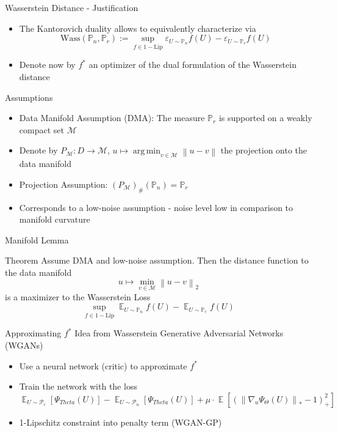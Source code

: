 \documentclass{beamer}
\newcommand{\norm}[1]{\left\lVert#1\right\rVert}
\DeclareMathOperator*{\argmin}{arg\,min}
\DeclareMathOperator{\EX}{\mathbb{E}}%
\begin{document}
\begin{frame}{Wasserstein Distance - Justification}
\begin{itemize}
\item The Kantorovich duality allows to equivalently characterize via 
$$
\text{Wass}(\mathbb{P}_{n}, \mathbb{P}_{r}) := \sup_{f \in 1-\text{Lip}} \varepsilon_{U \sim \mathbb{P}_{n}} f(U) - \varepsilon_{U \sim \mathbb{P}_{r}} f(U)
$$
\item Denote now by $f^{*}$ an optimizer of the dual formulation of the Wasserstein distance
\end{itemize}
\end{frame}

\begin{frame}{Assumptions}
\begin{itemize}
\item Data Manifold Assumption (DMA): The measure $\mathbb{P}_{r}$ is supported on a weakly compact set $\mathcal{M}$
\item Denote by $P_{\mathcal{M}}: D \rightarrow \mathcal{M}$, $u \mapsto \argmin_{v \in \mathcal{M}} \norm{u - v}$ the projection onto the data manifold
\item Projection Assumption: $(P_{\mathcal{M}})_{\text{\#}}(\mathbb{P}_{n}) = \mathbb{P}_r$
\item Corresponds to a low-noise assumption - noise level low in comparison to manifold curvature
\end{itemize}
\end{frame}

\begin{frame}{Manifold Lemma}
\begin{block}{Theorem}
Assume DMA and low-noise assumption. Then the distance function to the data manifold
$$
u \mapsto \min\limits_{v \in \mathcal{M}} \norm{u - v}_{2}
$$
is a maximizer to the Wasserstein Loss
$$
\sup_{f \in 1-\text{Lip}} \EX_{U \sim \mathbb{P}_{n}} f(U) 
- \EX_{U \sim \mathbb{P}_{r}} f(U)
$$
\end{block}
\end{frame}

\begin{frame}{Approximating $f^{*}$}
Idea from Wasserstein Generative Adversarial Networks (WGANs)
\begin{itemize}
\item Use a neural network (critic) to approximate $f^{*}$
\item Train the network with the loss
$$
\EX_{U \sim \mathcal{P}_{r}}[\Psi_{Theta}(U)] - 
\EX_{U \sim \mathcal{P}_{n}}[\Psi_{Theta}(U)] +
\mu \cdot \EX\left[ \left( 
\norm{\nabla_{u} \Psi_{\Theta}(U)}_{*} - 1
\right)^{2}_{+}
\right]
$$
\item 1-Lipschitz constraint into penalty term (WGAN-GP)
\end{itemize}
\end{frame}
\end{document}
